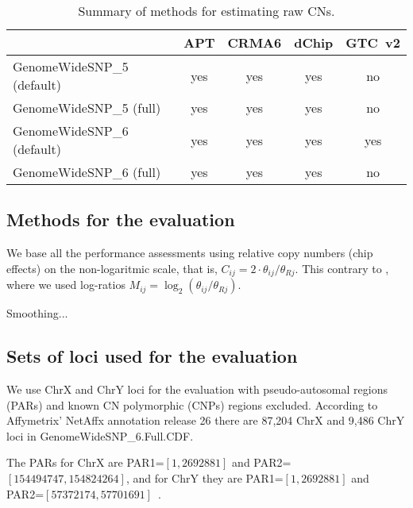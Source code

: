 \documentclass[11pt,a4paper]{article}
\newcommand{\GWSFive}{GWS5\xspace}
\newcommand{\GWSSix}{GWS6\xspace}
\newcommand{\GWSSixf}{GenomeWideSNP\_6\xspace}
\newcommand{\citet}[1]{\cite{#1}}
\begin{document}

\begin{table}
\begin{center}
\begin{tabular}{lcccc}
                             &  APT      & CRMA6     & dChip     & GTC~v2  \\
\hline
GenomeWideSNP\_5 (default)   &  yes      & yes       & yes       & no      \\
GenomeWideSNP\_5 (full)      &  yes      & yes       & yes       & no      \\
GenomeWideSNP\_6 (default)   &  yes      & yes       & yes       & yes     \\
GenomeWideSNP\_6 (full)      &  yes      & yes       & yes       & no      \\
\hline
\end{tabular}
\end{center}
\caption{Summary of methods for estimating raw CNs.}
\label{tblSummaryOfMethods}
\end{table}



\subsection*{Methods for the evaluation}
We base all the performance assessments using relative copy numbers (chip effects) on the non-logaritmic scale, that is, $C_{ij}=2\cdot\theta_{ij}/\theta_{Rj}$.  This contrary to \cite{BengtssonH_etal_2008a}, where we used log-ratios $M_{ij}=\log_2(\theta_{ij}/\theta_{Rj})$.  

Smoothing...


\subsection*{Sets of loci used for the evaluation}

We use ChrX and ChrY loci for the evaluation with pseudo-autosomal regions (PARs) and known CN polymorphic (CNPs) regions excluded.  
According to Affymetrix' NetAffx annotation release 26 there are 87,204 ChrX and 9,486 ChrY loci in \GWSSixf.Full.CDF.

The PARs for ChrX are PAR1=$[1,2692881]$ and PAR2=$[154494747,154824264]$, and for ChrY they are PAR1=$[1,2692881]$ and PAR2=$[57372174,57701691]$~\citet{BlaschkeRappold_2006}.
\end{document}
